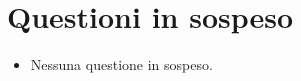 \documentclass[../verbale-2017-02-16.tex]{subfiles}
\begin{document}
	\section{Questioni in sospeso}
	\begin{itemize}
		\item Nessuna questione in sospeso.
	\end{itemize}
\end{document}
